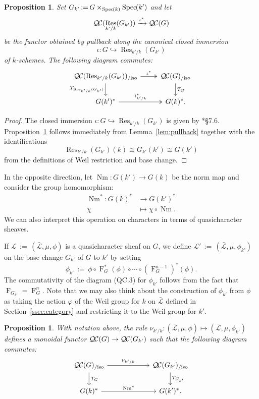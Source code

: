 \documentclass[CM,Submssn,SecEq]{degruyter-crelle} %
\theoremstyle{plain}
\newtheorem{proposition}[theorem]{Proposition}
\theoremstyle{definition}
\theoremstyle{remark}
\newcommand{\Weil}[1]{\mathcal{W}_{#1}}
\newcommand{\Frob}[1]{\operatorname{F}_{#1}}
\DeclareMathOperator{\Res}{Res}
\DeclareMathOperator{\Nm}{Nm}
\newcommand{\Spec}[1]{{\operatorname{Spec}\hskip-1pt( #1 )}}
\newcommand{\ceq}{{\, :=\, }}
\newcommand{\TrFrob}[1]{T_{#1}}
\newcommand{\qcs}[1]{{\mathcal{#1}}}
\newcommand{\gqcs}[1]{{\mathcal{\bar #1}}}
\newcommand{\QC}{{\mathcal{Q\hskip-0.8pt C}}}
\newcommand{\QCiso}[1]{\QC(#1)_{/\text{iso}}}
\begin{document}
\begin{proposition} \label{prop:csbe}
Set $G_{k'} \ceq G\times_\Spec{k} \Spec{k'}$ and let
\[
\QC(\Res_{k'/k}(G_{k'})) \xrightarrow{\iota^*} \QC(G)
\]
be the functor obtained by pullback along the canonical closed immersion 
\[\iota : G \hookrightarrow \Res_{k'/k}(G_{k'})\] of $k$-schemes.
The following diagram commutes:
\[
\begin{tikzcd}
\QCiso{\Res_{k'/k}(G_{k'})} \arrow[two heads]{r}{\iota^*} \dar[swap]{\TrFrob{\Res_{k'/k}(G_{k'})}} & \QCiso{G} \dar{\TrFrob{G}} \\
G(k')^* \arrow[two heads]{r}{i_{k'/k}^*} & G(k)^*.
\end{tikzcd}
\]
\end{proposition}
\begin{proof}
The closed immersion $\iota : G \hookrightarrow \Res_{k'/k}(G_{k'})$ is given by \cite{bosch-lutkebohmert-reynaud:NeronModels}*{\S 7.6}.
Proposition~\ref{prop:csbe} follows immediately from Lemma~\ref{lem:pullback} together with the identifications
\[
\Res_{k'/k}(G_{k'})(k) \cong G_{k'}(k') \cong G(k')
\]
from the definitions of Weil restriction and base change.
\end{proof}

In the opposite direction, let $\Nm : G(k') \to G(k)$ be the norm map and consider the group homomorphism:
\begin{align*}
\Nm^* : G(k)^* &\to G(k')^* \\
\chi &\mapsto \chi\circ \Nm.
\end{align*}
We can also interpret this operation on characters in terms of quasicharacter sheaves.

If $\qcs{L} \ceq (\gqcs{L}, \mu, \phi)$ is a quasicharacter sheaf on $G$, we define
$\qcs{L}' \ceq (\gqcs{L}, \mu, \phi_{k'})$ on the base change
$G_{k'}$ of $G$ to $k'$ by setting
\[
\phi_{k'} \ceq \phi \circ \Frob{G}^*(\phi) \circ \cdots \circ (\Frob{G}^{n-1})^*(\phi).
\]
The commutativity of the diagram (QC.3) for $\phi_{k'}$
follows from the fact that $\Frob{G_{k'}} = \Frob{G}^n$.
Note that we may also think about the construction of $\phi_{k'}$ from $\phi$
as taking the action $\varphi$ of the Weil group for $k$%
on $\gqcs{L}$
defined in Section~\ref{ssec:category} and restricting it to the Weil group for $k'$.

\begin{proposition}\label{prop:basechange}
With notation above,
the rule $\nu_{k'/k}: (\gqcs{L}, \mu, \phi) \mapsto (\gqcs{L}, \mu, \phi_{k'})$
 defines a monoidal functor $\QC(G) \to \QC(G_{k'})$
 such that the following diagram commutes:
\[
\begin{tikzcd}[column sep=60]
\QCiso{G} \rar{\nu_{k'/k}} \dar{\TrFrob{G}} & \QCiso{G_{k'}} \dar{\TrFrob{G_{k'}}} \\
G(k)^*  \rar{\Nm^*} & G(k')^*.
\end{tikzcd}
\]
\end{proposition}
\end{document}
